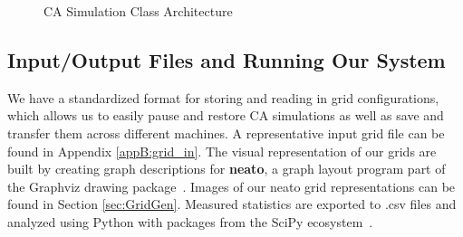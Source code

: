 \documentclass[a4paper,11pt]{report}
\begin{document}
\begin{figure}[htp]
\centering

\caption[CA Simulation Platform Architecture]{
	CA Simulation Class Architecture
}
\label{fig:sys_arch}
\end{figure}

\subsection{Input/Output Files and Running Our System}

We have a standardized format for storing and reading in grid configurations, which allows us to easily pause and restore CA simulations as well as save and transfer them across different machines. A representative input grid file can be found in Appendix \ref{appB:grid_in}. The visual representation of our grids are built by creating graph descriptions for \textbf{neato}, a graph layout program part of the Graphviz drawing package~\cite{el01}. Images of our neato grid representations can be found in Section \ref{sec:GridGen}. Measured statistics are exported to .csv files and analyzed using Python with packages from the SciPy ecosystem~\cite{jo14}.
\end{document}
